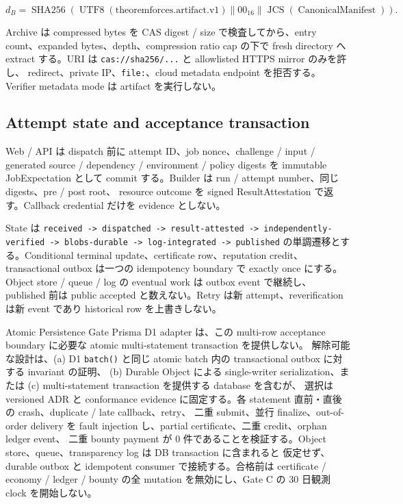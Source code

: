 \documentclass[a4paper,11pt]{ltjsarticle}
\newcommand{\code}[1]{\texttt{#1}}
\begin{document}
\begin{equation}
d_B=\operatorname{SHA256}(\operatorname{UTF8}(\mathrm{theoremforces.artifact.v1})\parallel 00_{16}\parallel
\operatorname{JCS}(\operatorname{CanonicalManifest})).
\end{equation}

Archive は compressed bytes を CAS digest / size で検査してから、entry count、expanded bytes、depth、compression ratio
cap の下で fresh directory へ extract する。URI は \code{cas://sha256/...} と allowlisted HTTPS mirror のみを許し、
redirect、private IP、\code{file:}、cloud metadata endpoint を拒否する。Verifier metadata mode は artifact を実行しない。

\subsection{Attempt state and acceptance transaction}

Web / API は dispatch 前に attempt ID、job nonce、challenge / input / generated source / dependency / environment /
policy digests を immutable JobExpectation として commit する。Builder は run / attempt number、同じ digests、pre / post root、
resource outcome を signed ResultAttestation で返す。Callback credential だけを evidence としない。

State は \code{received -> dispatched -> result-attested -> independently-verified -> blobs-durable -> log-integrated -> published}
の単調遷移とする。Conditional terminal update、certificate row、reputation credit、transactional outbox は一つの idempotency
boundary で exactly once にする。Object store / queue / log の eventual work は outbox event で継続し、published 前は public
accepted と数えない。Retry は新 attempt、reverification は新 event であり historical row を上書きしない。

\begin{atomicgatebox}{Atomic Persistence Gate}
Prisma D1 adapter は、この multi-row acceptance boundary に必要な atomic multi-statement transaction を提供しない。
解除可能な設計は、(a) D1 \code{batch()} と同じ atomic batch 内の transactional outbox に対する invariant の証明、
(b) Durable Object による single-writer serialization、または (c) multi-statement transaction を提供する database を含むが、
選択は versioned ADR と conformance evidence に固定する。各 statement 直前・直後の crash、duplicate / late callback、retry、
二重 submit、並行 finalize、out-of-order delivery を fault injection し、partial certificate、二重 credit、orphan ledger event、
二重 bounty payment が 0 件であることを検証する。Object store、queue、transparency log は DB transaction に含まれると
仮定せず、durable outbox と idempotent consumer で接続する。合格前は certificate / economy / ledger / bounty の全 mutation
を無効にし、Gate C の 30 日観測 clock を開始しない。
\end{atomicgatebox}
\end{document}
